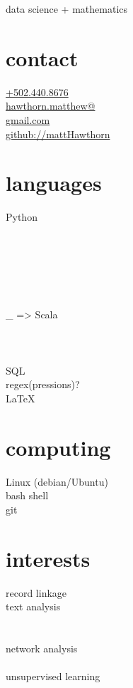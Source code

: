 \documentclass[letterpaper,10pt]{hawthorn-resume}
\begin{document}
\thispagestyle{empty}
       {data science + mathematics}

\begin{aside}
  \section{contact}
    \href{tel:15024408676}{+502.440.8676}\\
    \href{mailto:hawthorn.matthew@gmail.com}{hawthorn.matthew@\\gmail.com}\\
    \href{https://github.com/mattHawthorn}{github://mattHawthorn}\\
   \vspace{\baselineskip}
  \section{languages}
    Python\\
    \\
    \\
    \\
    \\
    \\
    \\
    \_ => Scala\\
    \\
    \\
    \\
    SQL\\
    regex(pressions)?\\
    \LaTeX \\
   \vspace{\baselineskip}
  \section{computing}
   Linux (debian/Ubuntu)\\
   bash shell\\
   git\\
   \vspace{\baselineskip}
\section{interests}
  record linkage\\
  text analysis\\
  \\
  \\
  network analysis\\
  \\
  unsupervised learning\\
  \\
  \\
\end{aside}
\end{document}
